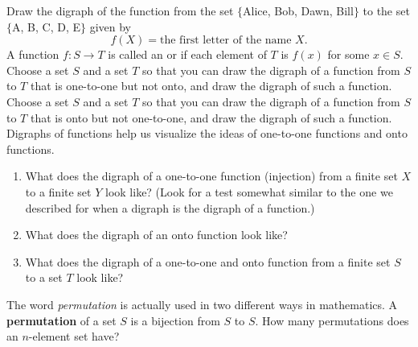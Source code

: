 \bp
\itemm Draw the digraph of the function from the set $\{$Alice, Bob, Dawn,
Bill$\}$ to the set $\{$A, B, C, D, E$\}$ given by $$f(X) = \mbox{the first
letter of the name $X$}.$$ 
\iteme A function
$f:S\rightarrow T$ is called an
 or
 if each
element of
$T$ is $f(x)$ for some $x\in S$.  Choose a set $S$ and a set $T$ so that you
can draw the digraph of a function from $S$ to $T$ that is one-to-one but not
onto, and draw the digraph of such a function.
\itemm Choose a set $S$ and a set $T$ so that you can draw the digraph of a
function from $S$ to $T$ that is onto but not one-to-one, and draw the
digraph of such a function.
\iteme Digraphs of functions help us visualize the ideas of one-to-one
functions and onto functions.
\begin{enumerate}
\item What does the digraph of a one-to-one function (injection) from
  a finite set $X$ to a finite set $Y$ look like? (Look for a test
  somewhat similar to the one we described for when a digraph is the
  digraph of a function.)
\item   What does the digraph of an onto function
  look like?
\item   What does the digraph of a one-to-one and onto function
  from a finite set $S$ to a set $T$ look
  like? \label{bijectiondigraph}
\end{enumerate}


\iteme The word {\em permutation} is actually used in two different ways in
mathematics.  A {\bf permutation} of a set
$S$ is a bijection from $S$ to
$S$.  How many permutations does an $n$-element set have?
\label{permutationasbijection}
\ep 

